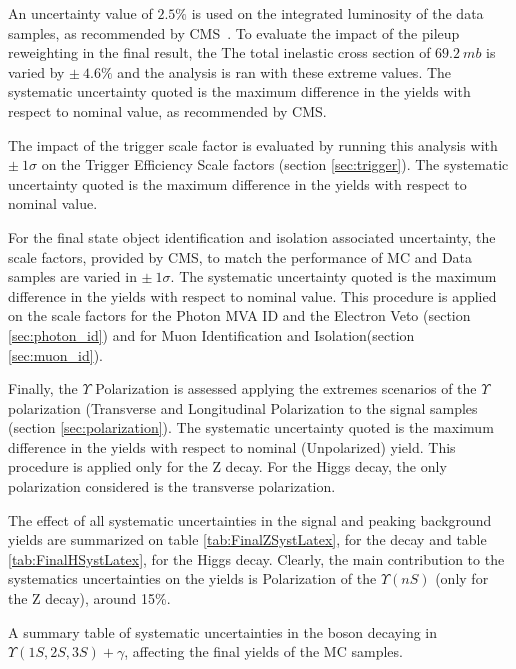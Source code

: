 An uncertainty value of $2.5\%$ is used on the integrated luminosity of the data samples, as recommended by CMS~\cite{CMS-PAS-LUM-17-001}. To evaluate the impact of the pileup reweighting in the final result, the The total inelastic cross section of $69.2~mb$ is varied by $\pm~4.6\%$ and the analysis is ran with these extreme values. The systematic uncertainty quoted is the maximum difference in the yields with respect to nominal value, as recommended by CMS. 

The impact of the trigger scale factor is evaluated by running this analysis with $\pm~1\sigma$ on the Trigger Efficiency Scale factors (section \ref{sec:trigger}). The systematic uncertainty quoted is the maximum difference in the yields with respect to nominal value.

For the final state object identification and isolation associated uncertainty, the scale factors, provided by CMS, to match the performance of MC and Data samples are varied in  $\pm~1\sigma$. The systematic uncertainty quoted is the maximum difference in the yields with respect to nominal value. This procedure is applied on the scale factors for the Photon MVA ID and the Electron Veto (section \ref{sec:photon_id}) and for  Muon Identification and Isolation(section \ref{sec:muon_id}). 

Finally, the $\Upsilon$ Polarization is assessed applying the extremes scenarios of the $\Upsilon$ polarization (Transverse and Longitudinal Polarization to the signal samples (section \ref{sec:polarization}). The systematic uncertainty quoted is the maximum difference in the yields with respect to nominal (Unpolarized) yield. This procedure is applied only for the Z decay. For the Higgs decay, the only polarization considered is the transverse polarization.

The effect of all systematic uncertainties in the signal and peaking background yields are summarized on table \ref{tab:FinalZSystLatex}, for the \Z decay and table \ref{tab:FinalHSystLatex}, for the Higgs decay. Clearly, the main contribution to the systematics uncertainties on the yields is Polarization of the $\Upsilon(nS)$ (only for the Z decay), around 15\%.

\begin{table}[ht]
  \begin{center}
    \caption{ A summary table of systematic uncertainties in the \Z boson decaying in $\Upsilon(1S,2S,3S) + \gamma$, affecting the final yields of the MC samples.}
    
    \label{tab:FinalZSystLatex}
  \end{center}
\end{table}


